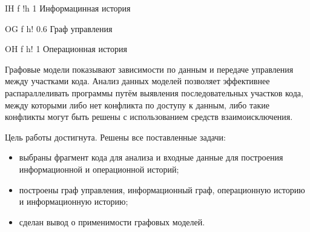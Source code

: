 \FloatBarrier
{}
{IH} %
{f} %
{!h} %
{1\textwidth} %
{Информацинная история} %
\FloatBarrier

\FloatBarrier
{}
{OG} %
{f} %
{h!} %
{0.6\textwidth} %
{Граф управления} %
\FloatBarrier

\FloatBarrier
{}
{OH} %
{f} %
{h!} %
{1\textwidth} %
{Операционная история} %
\FloatBarrier

Графовые модели показывают зависимости по данным и передаче управления между участками кода. Анализ данных моделей позволяет эффективнее распараллеливать программы путём выявления последовательных участков кода, между которыми либо нет конфликта по доступу к данным, либо такие конфликты могут быть решены с использованием средств взаимоисключения.


Цель работы достигнута. Решены все поставленные задачи: 
\begin{itemize}
	\item выбраны фрагмент кода для анализа и входные данные для построения информационной и операционной историй;
	\item построены граф управления, информационный граф, операционную историю и информационную историю;
	\item сделан вывод о применимости графовых моделей.
\end{itemize}
